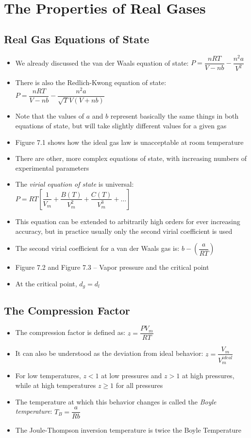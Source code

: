 \documentclass[12pt, openany, letterpaper]{memoir}
\begin{document}
\chapter{The Properties of Real Gases}
\section*{Real Gas Equations of State}
\begin{itemize}
	\item We already discussed the van der Waals equation of state: $P=\dfrac{nRT}{V-nb}-\dfrac{n^2a}{V^2}$
	\item There is also the Redlich-Kwong equation of state: $P=\dfrac{nRT}{V-nb}-\dfrac{n^2a}{\sqrt{T}V(V+nb)}$
	\item Note that the values of $a$ and $b$ represent basically the same things in both equations of state, but will take slightly different values for a given gas
	\item Figure 7.1 shows how the ideal gas law is unacceptable at room temperature
	\item There are other, more complex equations of state, with increasing numbers of experimental parameters
	\item The \emph{virial equation of state} is universal: $P=RT\left[\dfrac{1}{V_m}+\dfrac{B(T)}{V_m^2}+\dfrac{C(T)}{V_m^3}+\ldots\right]$
	\item This equation can be extended to arbitrarily high orders for ever increasing accuracy, but in practice usually only the second virial coefficient is used
	\item The second virial coefficient for a van der Waals gas is: $b - \left(\dfrac{a}{RT}\right)$
	\item Figure 7.2 and Figure 7.3 -- Vapor pressure and the critical point
	\item At the critical point, $d_g=d_l$
\end{itemize}
\section*{The Compression Factor}
\begin{itemize}
	\item The compression factor is defined as: $z=\dfrac{PV_m}{RT}$
	\item It can also be understood as the deviation from ideal behavior: $z=\dfrac{V_m}{V_m^{ideal}}$
	\item For low temperatures, $z<1$ at low pressures and $z>1$ at high pressures, while at high temperatures $z\geq1$ for all pressures
	\item The temperature at which this behavior changes is called the \emph{Boyle temperature}: $T_B=\dfrac{a}{Rb}$
	\item The Joule-Thompson inversion temperature is twice the Boyle Temperature
\end{itemize}
\end{document}
